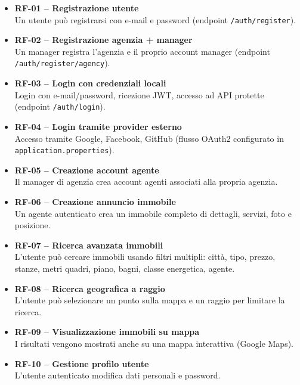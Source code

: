 \documentclass[a4paper,11pt]{report}
\begin{document}
\begin{itemize}[nosep]
  \item \textbf{RF-01 -- Registrazione utente}\\
  Un utente può registrarsi con e-mail e password (endpoint \texttt{/auth/register}).

  \item \textbf{RF-02 -- Registrazione agenzia + manager}\\
  Un manager registra l’agenzia e il proprio account manager (endpoint \texttt{/auth/register/agency}).

  \item \textbf{RF-03 -- Login con credenziali locali}\\
  Login con e-mail/password, ricezione JWT, accesso ad API protette (endpoint \texttt{/auth/login}).

  \item \textbf{RF-04 -- Login tramite provider esterno}\\
  Accesso tramite Google, Facebook, GitHub (flusso OAuth2 configurato in \texttt{application.properties}).

  \item \textbf{RF-05 -- Creazione account agente}\\
  Il manager di agenzia crea account agenti associati alla propria agenzia.

  \item \textbf{RF-06 -- Creazione annuncio immobile}\\
  Un agente autenticato crea un immobile completo di dettagli, servizi, foto e posizione.

  \item \textbf{RF-07 -- Ricerca avanzata immobili}\\
  L’utente può cercare immobili usando filtri multipli: città, tipo, prezzo, stanze, metri quadri, piano, bagni, classe energetica, agente.

  \item \textbf{RF-08 -- Ricerca geografica a raggio}\\
  L’utente può selezionare un punto sulla mappa e un raggio per limitare la ricerca.

  \item \textbf{RF-09 -- Visualizzazione immobili su mappa}\\
  I risultati vengono mostrati anche su una mappa interattiva (Google Maps).

  \item \textbf{RF-10 -- Gestione profilo utente}\\
  L’utente autenticato modifica dati personali e password.


\end{itemize}
\end{document}
